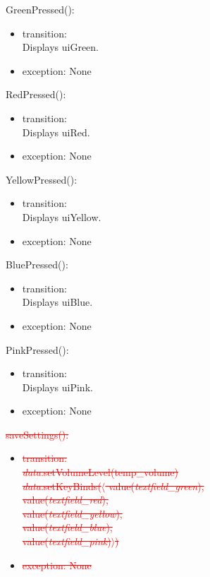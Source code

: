 \documentclass[12pt]{article}
\begin{document}
\noindent GreenPressed():
\begin{itemize}
	\item transition: \\
	Displays uiGreen.
	\item exception: None
\end{itemize}

\noindent RedPressed():
\begin{itemize}
	\item transition: \\
	Displays uiRed.
	\item exception: None
\end{itemize}

\noindent YellowPressed():
\begin{itemize}
	\item transition: \\
	Displays uiYellow.
	\item exception: None
\end{itemize}

\noindent BluePressed():
\begin{itemize}
	\item transition: \\
	Displays uiBlue.
	\item exception: None
\end{itemize}

\noindent PinkPressed():
\begin{itemize}
	\item transition: \\
	Displays uiPink.
	\item exception: None
\end{itemize}

\noindent \textcolor{red}{\sout{saveSettings():}}
\begin{itemize}
	\item \textcolor{red}{\sout{transition:}} \\
	\textcolor{red}{\sout{\textit{data}.setVolumeLevel(temp\_volume)}}\\
	\textcolor{red}{\sout{\textit{data}.setKeyBinds($\langle$ value(\textit{textfield\_green}),}} \\
	\textcolor{red}{\sout{\hspace*{3.65cm}value(\textit{textfield\_red}),}} \\
	\textcolor{red}{\sout{\hspace*{3.65cm}value(\textit{textfield\_yellow}),}} \\
	\textcolor{red}{\sout{\hspace*{3.65cm}value(\textit{textfield\_blue}),}} \\
	\textcolor{red}{\sout{\hspace*{3.65cm}value(\textit{textfield\_pink})$\rangle$)}}
	
	\item \textcolor{red}{\sout{exception: None}}
\end{itemize}
\end{document}
